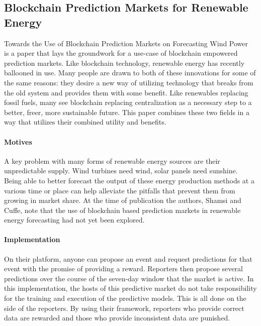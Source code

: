 \documentclass{article}
\begin{document}
    \subsection{Blockchain Prediction Markets for Renewable Energy}

    Towards the Use of Blockchain Prediction Markets on Forecasting Wind Power~\cite{windForcasting} is a paper that lays the
    groundwork for a use-case of blockchain empowered prediction markets. Like blockchain technology, renewable energy has
    recently ballooned in use. Many people are drawn to both of these innovations for some of the same reasons:
    they desire a new way of utilizing technology that breaks from the old system and provides them with some benefit.
    Like renewables replacing fossil fuels, many see blockchain replacing centralization as a necessary step to a better,
    freer, more sustainable future.  This paper combines these two fields in a way that utilizes their combined utility
    and benefits.

    \paragraph{Motives}
    A key problem with many forms of renewable energy sources are their unpredictable supply. Wind turbines need wind,
    solar panels need sunshine. Being able to better forecast the output of these energy production methods at a various
    time or place can help alleviate the pitfalls that prevent them from growing in market share.  At the time of publication
    the authors, Shamsi and Cuffe, note that the use of blockchain based prediction markets in renewable energy forecasting
    had not yet been explored.

    \paragraph{Implementation}
    On their platform, anyone can propose an event and request predictions for that event with the promise of providing
    a reward.  Reporters then propose several predictions over the course of the seven-day window that the market is
    active.  In this implementation, the hosts of this predictive market do not take responsibility for the training
    and execution of the predictive models.  This is all done on the side of the reporters.  By using their framework,
    reporters who provide correct data are rewarded and those who provide inconsistent data are punished.
\end{document}
